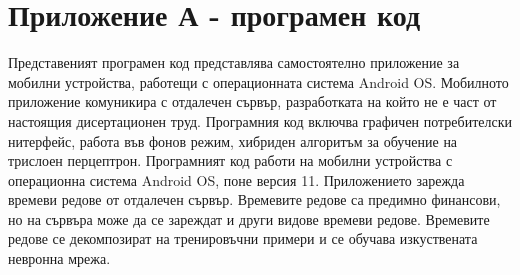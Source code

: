 ﻿
\chapter*{Приложение А - програмен код}

Представеният програмен код представлява самостоятелно приложение за мобилни устройства, работещи с операционната система Android OS. Мобилното приложение комуникира с отдалечен сървър, разработката на който не е част от настоящия дисертационен труд. Програмния код включва графичен потребителски нитерфейс, работа във фонов режим, хибриден алгоритъм за обучение на трислоен перцептрон. Програмният код работи на мобилни устройства с операционна система Android OS, поне версия 11. Приложението зарежда времеви редове от отдалечен сървър. Времевите редове са предимно финансови, но на сървъра може да се зареждат и други видове времеви редове. Времевите редове се декомпозират на тренировъчни примери и се обучава изкуствената невронна мрежа. 

\vspace*{5mm}

